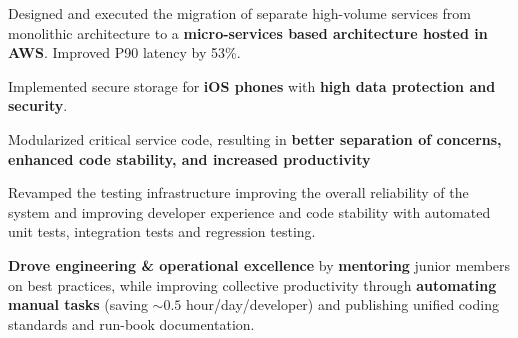 \begin{cventries}
{\begin{cvitems}
            \item {Designed and executed the migration of separate high-volume services from monolithic architecture to a \textbf{micro-services based architecture hosted in AWS}. Improved P90 latency by 53\%.} %
	   		\item {Implemented secure storage for \textbf{iOS phones} with \textbf{high data protection and security}.} %
            \item {Modularized critical service code, resulting in \textbf{better separation of concerns, enhanced code stability, and increased productivity}} %
            \item {Revamped the testing infrastructure improving the overall reliability of the system and improving developer experience and code stability with automated unit tests, integration tests and regression testing.}  %
            \item {\textbf{Drove engineering \& operational excellence} by \textbf{mentoring} junior members on best practices, while improving collective productivity through \textbf{automating manual tasks} (saving $\sim0.5$ hour/day/developer) and publishing unified coding standards and run-book documentation.}    
        	 \item[]
		\end{cvitems}
    }




\end{cventries}
